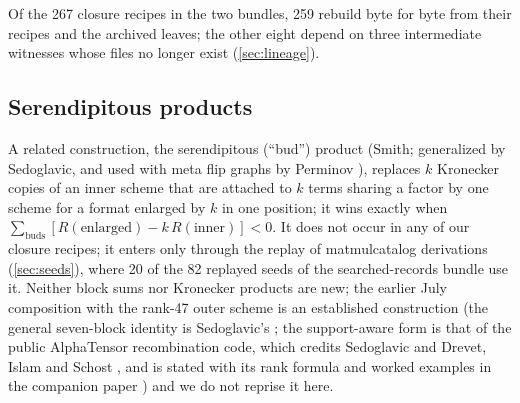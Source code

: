 Of the 267 closure recipes in the two bundles, 259 rebuild byte for byte from their recipes and the archived leaves; the other eight depend on three intermediate witnesses whose files no longer exist (\cref{sec:lineage}).

\subsection{Serendipitous products}
A related construction, the serendipitous (``bud'') product (Smith; generalized by Sedoglavic, and used with meta flip graphs by Perminov \cite{perminov2026serendipitous}), replaces $k$ Kronecker copies of an inner scheme that are attached to $k$ terms sharing a factor by one scheme for a format enlarged by $k$ in one position;
it wins exactly when $\sum_{\text{buds}}[R(\text{enlarged})-k\,R(\text{inner})]<0$. It does not occur in any of our closure recipes; it enters only through the replay of matmulcatalog derivations (\cref{sec:seeds}), where 20 of the 82 replayed seeds of the searched-records bundle use it.
Neither block sums nor Kronecker products are new; the earlier July composition with the rank-47 outer scheme is an established construction (the general seven-block identity is Sedoglavic's \cite{sedoglavic2017seven}; the support-aware form is that of the public AlphaTensor recombination code, which credits Sedoglavic and Drevet, Islam and Schost \cite{drevet2011optimization}, and is stated with its rank formula and worked examples in the companion paper \cite{peterson2026results}) and we do not reprise it here.
